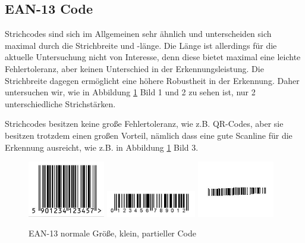 \subsection*{EAN-13 Code}
\writtenby{\dcauthornameriren}%
Strichcodes sind sich im Allgemeinen sehr ähnlich und unterscheiden sich maximal durch die Strichbreite und -länge. Die Länge ist allerdings für die aktuelle Unter\-suchung nicht von Interesse, denn diese bietet maximal eine leichte Fehlertoleranz, aber keinen Unterschied in der Erkennungsleistung. Die Strichbreite dagegen ermöglicht eine höhere Robustheit in der Erkennung. Daher untersuchen wir, wie in Abbild\-ung \ref{fig:eannormal} Bild 1 und 2 zu sehen ist, nur 2 unterschiedliche Strichstärken. 

Strichcodes besitzen keine große Fehlertoleranz, wie z.B. QR-Codes, aber sie besitz\-en trotzdem einen großen Vorteil, nämlich dass eine gute Scanline für die Erkennung ausreicht, wie z.B. in Abbildung \ref{fig:eannormal} Bild 3.
\begin{figure}[H]
  \centering
  \includegraphics[width=0.30\textwidth]{img/EAN13/perfect_01.jpg}
  \includegraphics[width=0.35\textwidth]{img/EAN13/perfect_02.jpg}
  \includegraphics[width=0.30\textwidth]{img/EAN13/compensation_01.jpg}
  \caption{EAN-13 normale Größe, klein, partieller Code}
  \label{fig:eannormal}
\end{figure}

